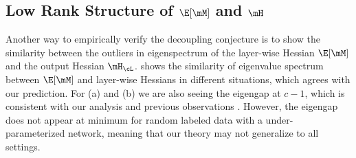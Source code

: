 \subsection{Low Rank Structure of \texorpdfstring{$\E[\mM]$}{EM} and \texorpdfstring{$\mH$}{H}}
\label{sec:emp_outlier}
Another way to empirically verify the decoupling conjecture is to show the similarity between the outliers in eigenspectrum of the layer-wise Hessian $\E[\mM]$ and the output Hessian $\mH_\cL$.
 shows the similarity of eigenvalue spectrum between $\E[\mM]$ and layer-wise Hessians in different situations, which agrees with our prediction. For (a) and  (b) we are also seeing the eigengap at $c-1$, which is consistent with our analysis and previous observations \citep{sagun2017empirical,papyan2019measurements}. However, the eigengap does not appear at minimum for random labeled data with a under-parameterized network, meaning that our theory may not generalize to all settings.

